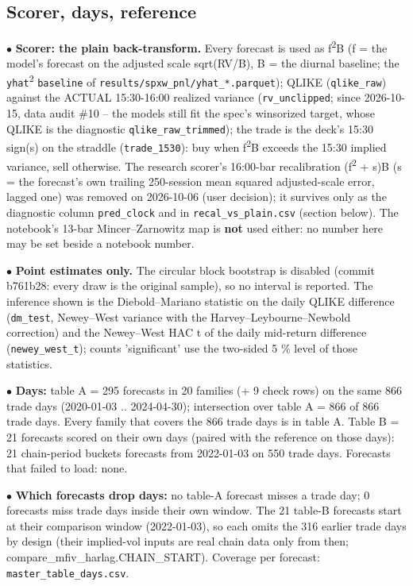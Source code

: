 \documentclass[10pt]{article}
\begin{document}
\subsection*{Scorer, days, reference}
$\bullet$ \textbf{Scorer: the plain back-transform.} Every forecast is used as f\textsuperscript{2}\textperiodcentered{}B (f = the model's forecast on the adjusted scale sqrt(RV/\allowbreak{}B), B = the diurnal baseline; the \texttt{yhat}\textsuperscript{2} \textperiodcentered{} \texttt{baseline} of \texttt{results/\allowbreak{}spxw\_pnl/\allowbreak{}yhat\_*.parquet}); QLIKE (\texttt{qlike\_raw}) against the ACTUAL 15:30-16:00 realized variance (\texttt{rv\_unclipped}; since 2026-10-15, data audit \#10 -- the models still fit the spec's winsorized target, whose QLIKE is the diagnostic \texttt{qlike\_raw\_trimmed}); the trade is the deck's 15:30 sign(s) on the straddle (\texttt{trade\_1530}): buy when f\textsuperscript{2}\textperiodcentered{}B exceeds the 15:30 implied variance, sell otherwise. The research scorer's 16:00-bar recalibration (f\textsuperscript{2} + s)\textperiodcentered{}B (s = the forecast's own trailing 250-session mean squared adjusted-scale error, lagged one) was removed on 2026-10-06 (user decision); it survives only as the diagnostic column \texttt{pred\_clock} and in \texttt{recal\_vs\_plain.csv} (section below). The notebook's 13-bar Mincer--Zarnowitz map is \textbf{not} used either: no number here may be set beside a notebook number.\par
$\bullet$ \textbf{Point estimates only.} The circular block bootstrap is disabled (commit b761b28: every draw is the original sample), so no interval is reported. The inference shown is the Diebold--Mariano statistic on the daily QLIKE difference (\texttt{dm\_test}, Newey--West variance with the Harvey--Leybourne--Newbold correction) and the Newey--West HAC t of the daily mid-return difference (\texttt{newey\_west\_t}); counts 'significant' use the two-sided 5 \% level of those statistics.\par
$\bullet$ \textbf{Days:} table A = 295 forecasts in 20 families (+ 9 check rows) on the same 866 trade days (2020-01-03 .. 2024-04-30); intersection over table A = 866 of 866 trade days. Every family that covers the 866 trade days is in table A. Table B = 21 forecasts scored on their own days (paired with the reference on those days): 21 chain-period buckets forecasts from 2022-01-03 on 550 trade days. Forecasts that failed to load: none.\par
$\bullet$ \textbf{Which forecasts drop days:} no table-A forecast misses a trade day; 0 forecasts miss trade days inside their own window. The 21 table-B forecasts start at their comparison window (2022-01-03), so each omits the 316 earlier trade days by design (their implied-vol inputs are real chain data only from then; compare\_mfiv\_harlag.CHAIN\_START). Coverage per forecast: \texttt{master\_table\_days.csv}.\par
\end{document}
